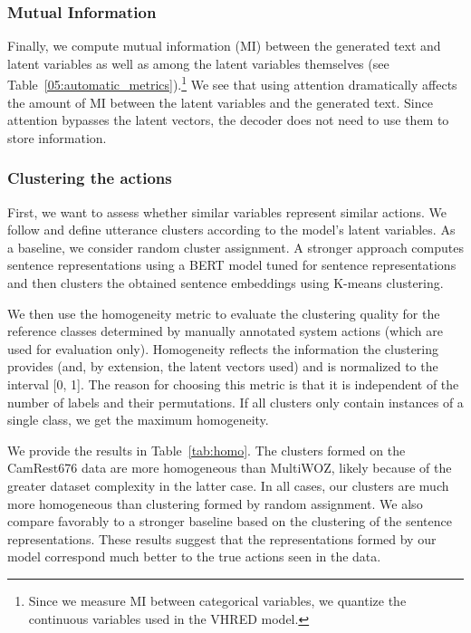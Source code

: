 \subsubsection{Mutual Information}
Finally, we compute mutual information (MI) between the generated text and latent variables as well as among the latent variables themselves (see Table~\ref{05:automatic_metrics}).\footnote{
Since we measure MI between categorical variables, we quantize the continuous variables used in the VHRED model.}
We see that using attention dramatically affects the amount of MI between the latent variables and the generated text.
Since attention bypasses the latent vectors, the decoder does not need to use them to store information.

\subsubsection{Clustering the actions}
\label{sec:clustering}
First, we want to assess whether similar variables represent similar actions.
We follow \citet{zhao2018unsupervised} and define utterance clusters according to the model's latent variables.
As a baseline, we consider random cluster assignment.
A stronger approach computes sentence representations using a BERT model tuned for sentence representations \cite{reimers-2019-sentence-bert} and then clusters the obtained sentence embeddings using K-means clustering.

We then use the homogeneity metric \cite{rosenberg-hirschberg-2007-v} to evaluate the clustering quality for the reference classes determined by manually annotated system actions (which are used for evaluation only).
Homogeneity reflects the information the clustering provides (and, by extension, the latent vectors used) and is normalized to the interval [0, 1].
The reason for choosing this metric is that it is independent of the number of labels and their permutations.
If all clusters only contain instances of a single class, we get the maximum homogeneity.

We provide the results in Table~\ref{tab:homo}.
The clusters formed on the CamRest676 data are more homogeneous than MultiWOZ, likely because of the greater dataset complexity in the latter case. 
In all cases, our clusters are much more homogeneous than clustering formed by random assignment.
We also compare favorably to a stronger baseline based on the clustering of the sentence representations.
These results suggest that the representations formed by our model correspond much better to the true actions seen in the data.

